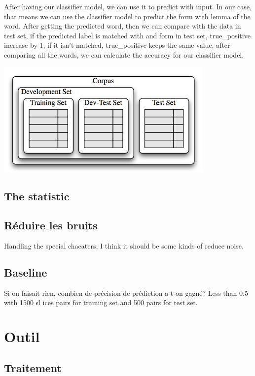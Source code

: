 \documentclass[a4paper]{article}
\begin{document}
After having our classifier model, we can use it to predict with input. In our case, that means we can use the classifier model to predict the form with lemma of the word. After getting the predicted word, then we can compare with the data in test set, if the predicted label is matched with and form in test set, true\_positive increase by 1, if it isn't matched, true\_positive keeps the same value, after comparing all the words, we can calculate the accuracy for our classifier model. 

\begin{center}
\includegraphics[width=0.8\textwidth]{Corpus.png}
\end{center}

\subsection{The statistic}


\subsection{Réduire les bruits}
Handling the special chacaters, I think it should be some kinds of reduce noise.
\subsection{Baseline}
Si on faisait rien, combien de précision de prédiction a-t-on gagné? 
Less than 0.5 with 1500 sl	ices pairs for training set and 500 pairs for test set.

\section{Outil}
\subsection{Traitement}
\end{document}
